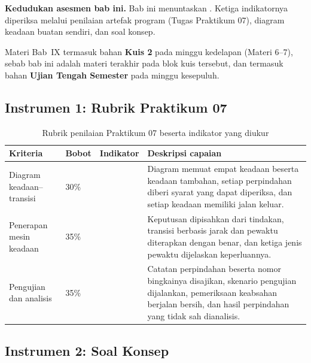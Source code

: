 \label{sec:asesmen-fsm}

\begin{asesmenbox}
\textbf{Kedudukan asesmen bab ini.} Bab ini menuntaskan .
Ketiga indikatornya diperiksa melalui penilaian artefak program (Tugas
Praktikum 07), diagram keadaan buatan sendiri, dan soal konsep.

\vspace{0.4em}
Materi Bab~IX termasuk bahan \textbf{Kuis 2} pada minggu kedelapan
(Materi 6--7), sebab bab ini adalah materi terakhir pada blok kuis tersebut,
dan termasuk bahan \textbf{Ujian Tengah Semester} pada minggu kesepuluh.
\end{asesmenbox}

\subsection*{Instrumen 1: Rubrik Praktikum 07}

\begin{table}[htbp]
\centering
\caption{Rubrik penilaian Praktikum 07 beserta indikator yang diukur}
\label{tab:rubrik-praktikum-07}
{\setlength{\tabcolsep}{4pt}\footnotesize%
\begin{tabularx}{\textwidth}{@{}L{3.2cm} C{1.3cm} C{2.1cm} Y@{}}
\toprule
\headrow \textbf{Kriteria} & \textbf{Bobot} & \textbf{Indikator} & \textbf{Deskripsi capaian} \\
\midrule
Diagram keadaan--transisi & 30\% &  &
Diagram memuat empat keadaan beserta keadaan tambahan, setiap perpindahan
diberi syarat yang dapat diperiksa, dan setiap keadaan memiliki jalan keluar. \\
\addlinespace
Penerapan mesin keadaan & 35\% &  &
Keputusan dipisahkan dari tindakan, transisi berbasis jarak dan pewaktu
diterapkan dengan benar, dan ketiga jenis pewaktu dijelaskan keperluannya. \\
\addlinespace
Pengujian dan analisis & 35\% &  &
Catatan perpindahan beserta nomor bingkainya disajikan, skenario pengujian
dijalankan, pemeriksaan keabsahan berjalan bersih, dan hasil perpindahan yang
tidak sah dianalisis. \\
\bottomrule
\end{tabularx}}
\end{table}

\subsection*{Instrumen 2: Soal Konsep}

